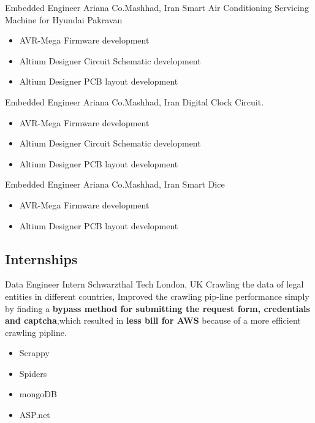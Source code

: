 	{Embedded Engineer}
	{Ariana Co.}{Mashhad, Iran}
	{
         \newline
        Smart Air Conditioning Servicing Machine for Hyundai Pakravan
        }
        {\begin{itemize}
            \item AVR-Mega Firmware development
            \item Altium Designer Circuit Schematic development
            \item Altium Designer  PCB layout development 
        \end{itemize}}


	{Embedded Engineer}
	{Ariana Co.}{Mashhad, Iran}
	{
        \newline 
        Digital Clock Circuit.
        }
        {
        \begin{itemize}
            \item AVR-Mega Firmware development
            \item Altium Designer Circuit Schematic development
            \item Altium Designer  PCB layout development 
        \end{itemize}
        }

	{Embedded Engineer}
	{Ariana Co.}{Mashhad, Iran}
	{
        \newline 
        Smart Dice
        }
        {
        \begin{itemize}
            \item AVR-Mega Firmware development
            \item Altium Designer  PCB layout development 
        \end{itemize}
        }


 

\vspace{2mm}
\subsection{\Large{Internships}}


                {Data Engineer Intern}
                {Schwarzthal Tech}
                {London, UK}
                {
                \newline
                Crawling the data of legal entities in different countries, Improved the crawling pip-line performance simply by finding a  \textbf{bypass method for submitting the request form, credentials and captcha},which resulted in \textbf{less bill for AWS} because of a more efficient crawling pipline.  } 
                {
                \begin{itemize}
                    \item Scrappy
                    \item Spiders
                    \item mongoDB
                    \item ASP.net 
                \end{itemize}
                }
        
